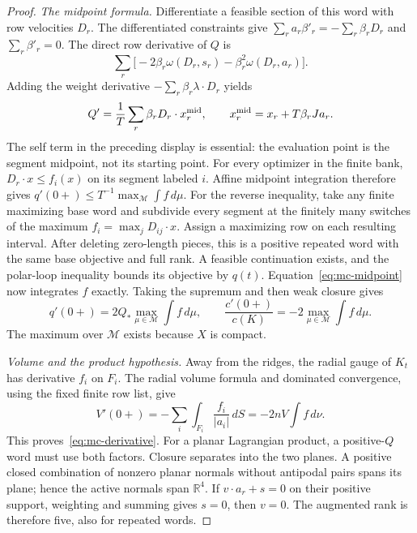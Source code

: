 \begin{proof}
\emph{The midpoint formula.}
Differentiate a feasible section of this word with row velocities $D_r$.
The differentiated constraints give
$\sum_ra_r\beta'_r=-\sum_r\beta_rD_r$ and $\sum_r\beta'_r=0$.
The direct row derivative of $Q$ is
\[
 \sum_r\bigl[-2\beta_r\omega(D_r,s_r)
              -\beta_r^2\omega(D_r,a_r)\bigr].
\]
Adding the weight derivative $-\sum_r\beta_r\lambda\cdot D_r$ yields
\begin{equation}\label{eq:mc-midpoint}
 Q'=\frac1T\sum_r\beta_rD_r\cdot x_r^{\rm mid},
 \qquad x_r^{\rm mid}=x_r+T\beta_rJa_r.
\end{equation}
The self term in the preceding display is essential: the evaluation point
is the segment midpoint, not its starting point.
For every optimizer in the finite bank, $D_r\cdot x\leq f_i(x)$ on its
segment labeled $i$. Affine midpoint integration therefore gives
$q'(0+)\leq T^{-1}\max_{\mathcal M}\int f\,d\mu$.
For the reverse inequality, take any finite maximizing base word and
subdivide every segment at the finitely many switches of the maximum
$f_i=\max_jD_{ij}\cdot x$. Assign a maximizing row on each resulting interval.
After deleting zero-length pieces, this is a positive repeated word with the
same base objective and full rank. A feasible continuation exists, and the
polar-loop inequality bounds its objective by $q(t)$.
Equation~\eqref{eq:mc-midpoint} now integrates $f$ exactly. Taking the supremum
and then weak closure gives
\[
 q'(0+)=2Q_*\max_{\mu\in\mathcal M}\int f\,d\mu,
 \qquad \frac{c'(0+)}{c(K)}=-2\max_{\mu\in\mathcal M}\int f\,d\mu.
\]
The maximum over $\mathcal M$ exists because $X$ is compact.

\emph{Volume and the product hypothesis.}
Away from the ridges, the radial gauge of $K_t$ has derivative $f_i$ on
$F_i$. The radial volume formula and dominated convergence, using the fixed
finite row list, give
\[
 V'(0+)=-\sum_i\int_{F_i}\frac{f_i}{|a_i|}\,dS
        =-2nV\int f\,d\nu.
\]
This proves~\eqref{eq:mc-derivative}.
For a planar Lagrangian product, a positive-$Q$ word must use both factors.
Closure separates into the two planes. A positive closed combination of
nonzero planar normals without antipodal pairs spans its plane; hence the
active normals span $\mathbb R^4$. If $v\cdot a_r+s=0$ on their positive
support, weighting and summing gives $s=0$, then $v=0$. The augmented rank is
therefore five, also for repeated words.
\end{proof}

